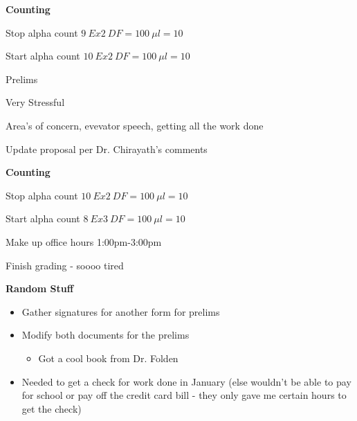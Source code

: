 \documentclass[idxtotoc,hyperref,openany,oneside]{labbook} %
\newcommand{\cmark}{\ding{51}}%
\newcommand{\done}{\rlap{$\square$}{\raisebox{2pt}{\large\hspace{1pt}\cmark}}%
  \hspace{-2.5pt}}
\begin{document}
\textbf{Counting}
\begin{todolist}
\item[\done]{Stop alpha count $\boxed{9\ Ex2\ DF=100\ \mu l=10}$}
\item[\done]{Start alpha count $\boxed{10\ Ex2\ DF=100\ \mu l=10}$}
\end{todolist}





\begin{todolist}
\item[\done]{Prelims}
  \begin{todolist}
  \item{Very Stressful}
  \item{Area's of concern, evevator speech, getting all the work done}
  \end{todolist}
\item[\done]{Update proposal per Dr. Chirayath's comments}
\end{todolist}


\textbf{Counting}
\begin{todolist}
\item[\done]{Stop alpha count $\boxed{10\ Ex2\ DF=100\ \mu l=10}$}
\item[\done]{Start alpha count $\boxed{8\ Ex3\ DF=100\ \mu l=10}$}
\end{todolist}

\begin{todolist}
\item[\done]{Make up office hours 1:00pm-3:00pm}
\item[\done]{Finish grading - soooo tired}
\end{todolist}



\textbf{Random Stuff}
\begin{itemize}
\item{Gather signatures for another form for prelims}
\item{Modify both documents for the prelims}
  \begin{itemize}
  \item{Got a cool book from Dr. Folden}
  \end{itemize}
\item{Needed to get a check for work done in January (else wouldn't be able to pay
  for school or pay off the credit card bill - they only gave me certain hours to get the check)}
\end{itemize}
\end{document}
